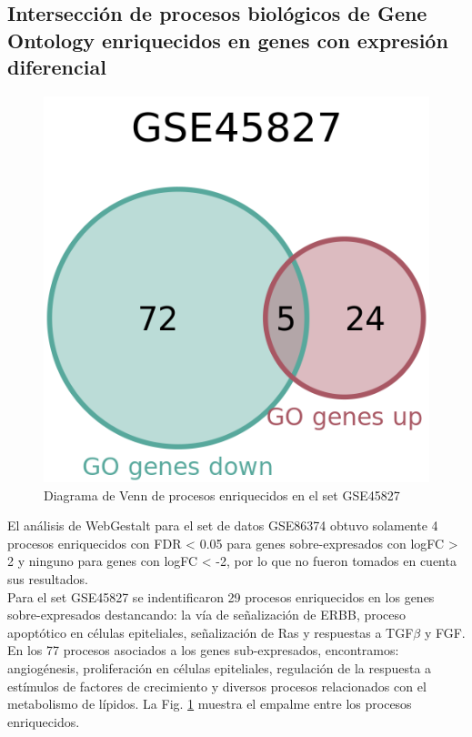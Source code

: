 \documentclass{article}
\begin{document}
\subsection*{Intersección de procesos biológicos de Gene Ontology enriquecidos en genes con expresión diferencial}

\begin{figure}
\centering
\includegraphics[scale=1.0]{../figures/GSE45827_webgestalt.png}
\caption{Diagrama de Venn de procesos enriquecidos en el set GSE45827}
\label{fig:vennGSE45827}
\end{figure}

El análisis de WebGestalt para el set de datos GSE86374 obtuvo solamente 4 procesos enriquecidos con FDR < 0.05 para genes sobre-expresados con logFC > 2 y ninguno para genes con logFC < -2, por lo que no fueron tomados en cuenta sus resultados. \\
Para el set GSE45827 se indentificaron 29 procesos enriquecidos en los genes sobre-expresados destancando: la vía de señalización de ERBB, proceso apoptótico en células epiteliales, señalización de Ras y respuestas a TGF$\beta$ y FGF. En los 77 procesos asociados a los genes sub-expresados, encontramos: angiogénesis, proliferación en células epiteliales, regulación de la respuesta a estímulos de factores de crecimiento y diversos procesos relacionados con el metabolismo de lípidos. La Fig. \ref{fig:vennGSE45827} muestra el empalme entre los procesos enriquecidos. \\
\end{document}
